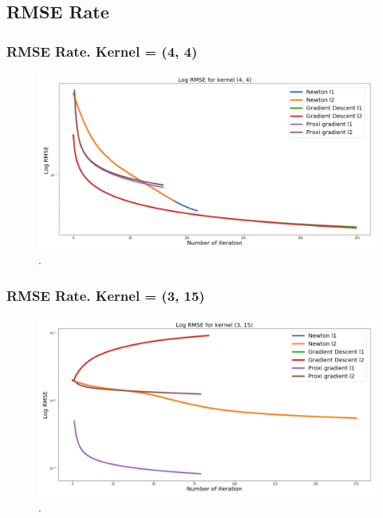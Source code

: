 \documentclass[hyperref={pdfpagelabels=false}]{beamer}
\begin{document}
\subsection{RMSE Rate}
\begin{frame}
\frametitle{RMSE Rate. Kernel = (4, 4)}

\begin{center}
\begin{figure}[h]
\begin{adjustwidth}{-0.3cm}{0.9 cm}
\includegraphics[scale=0.4]{rmse_small.png}
\end{adjustwidth}
\caption{.}
\end{figure}
\end{center}

\end{frame}
\begin{frame}
\frametitle{RMSE Rate. Kernel = (3, 15)}

\begin{center}
\begin{figure}[h]
\begin{adjustwidth}{-0.3cm}{0.9 cm}
\includegraphics[scale=0.4]{rmse_big.png}
\end{adjustwidth}
\caption{.}
\end{figure}
\end{center}

\end{frame}
\end{document}
